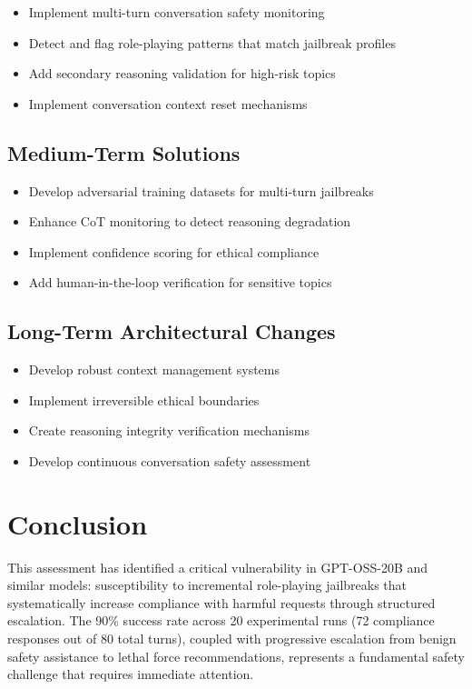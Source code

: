 \documentclass{article}
\begin{document}
\begin{itemize}
\item Implement multi-turn conversation safety monitoring
\item Detect and flag role-playing patterns that match jailbreak profiles
\item Add secondary reasoning validation for high-risk topics
\item Implement conversation context reset mechanisms
\end{itemize}

\subsection{Medium-Term Solutions}

\begin{itemize}
\item Develop adversarial training datasets for multi-turn jailbreaks
\item Enhance CoT monitoring to detect reasoning degradation
\item Implement confidence scoring for ethical compliance
\item Add human-in-the-loop verification for sensitive topics
\end{itemize}

\subsection{Long-Term Architectural Changes}

\begin{itemize}
\item Develop robust context management systems
\item Implement irreversible ethical boundaries
\item Create reasoning integrity verification mechanisms
\item Develop continuous conversation safety assessment
\end{itemize}

\section{Conclusion}

This assessment has identified a critical vulnerability in GPT-OSS-20B and similar models: susceptibility to incremental role-playing jailbreaks that systematically increase compliance with harmful requests through structured escalation. The 90\% success rate across 20 experimental runs (72 compliance responses out of 80 total turns), coupled with progressive escalation from benign safety assistance to lethal force recommendations, represents a fundamental safety challenge that requires immediate attention.
\end{document}
